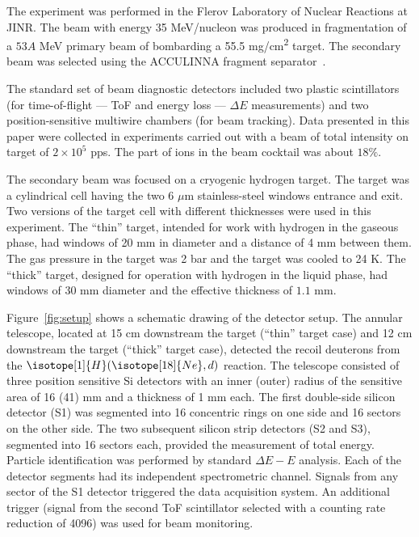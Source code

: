 \documentclass[superscriptaddress,showpacs,showkeys,twoside,floatfix,twocolumn]
{revtex4-1}
\begin{document}
The experiment was performed in the Flerov Laboratory of Nuclear Reactions at JINR\@.
The  beam with energy {35} MeV/nucleon was produced in
fragmentation of a \(53A\) MeV primary beam of 
bombarding a 55.5 mg/cm\textsuperscript{2}  target.
The secondary beam was selected using the ACCULINNA fragment separator~\cite{Rodin:1997}.


The standard set of beam diagnostic detectors included two plastic scintillators
(for time-of-flight --- ToF and energy loss --- $\Delta E$ measurements)
and two position-sensitive multiwire chambers
(for beam tracking).
Data presented in this paper were collected in experiments carried out with
a beam of total intensity on target of \(2\times10^5\) pps.
The part of  ions in the beam cocktail was about $18\%$.


The secondary beam was focused on a cryogenic hydrogen target.
The target was a cylindrical cell having the two 6 \(\mu\)m stainless-steel
windows entrance and exit.
Two versions of the target cell with different thicknesses were used in this experiment.
The ``thin'' target, intended for work with hydrogen in the gaseous phase,
had windows of 20 mm in diameter and a distance of 4 mm between them.
The gas pressure in the target was 2 bar and
the target was cooled to 24 K.
The ``thick'' target, designed for operation with hydrogen in the liquid phase,
had windows of 30 mm diameter and the effective thickness of $1.1$ mm.


Figure~\ref{fig:setup} shows a schematic drawing of the detector setup.
The annular telescope, located at 15 cm downstream the target (``thin'' target case)
and 12 cm downstream the target (``thick'' target case), detected the recoil
deuterons from the \(\isotope[1]{H}(\isotope[18]{Ne},d)\) reaction.
The telescope consisted of three position sensitive Si detectors with
an inner (outer) radius of the sensitive area of 16 (41)  mm and a thickness of 1 mm each.
The first double-side silicon detector (S1) was segmented into
16 concentric rings on one side and 16 sectors on the other side.
The two subsequent silicon strip detectors (S2 and S3),
segmented into 16 sectors each, provided the measurement of total energy.
Particle identification was performed by standard $\Delta E-E$ analysis.
Each of the detector segments had its independent spectrometric channel.
Signals from any sector of the S1 detector triggered the data acquisition system.
An additional trigger (signal from the second ToF scintillator selected with
a counting rate reduction of 4096) was used for beam monitoring.
\end{document}
